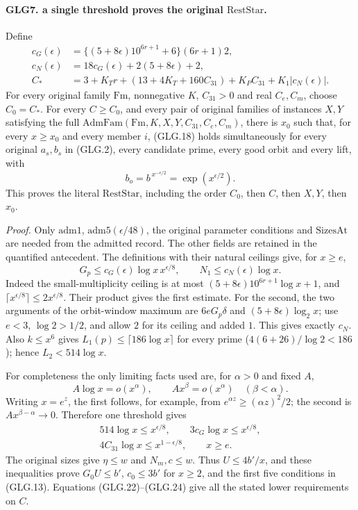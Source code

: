 \paragraph{GLG7. a single threshold proves the original \(\mathrm{RestStar}\).}
\label{claim:GLG7}
Define
\[
 \begin{split}
 c_G(\epsilon)&=\{(5+8\epsilon)10^{6r+1}+6\}(6r+1)2,\\
 c_N(\epsilon)&=18c_G(\epsilon)+2(5+8\epsilon)+2,\\
 C_*&=3+K_Tr+(13+4K_T+160C_{31})
                    +K_PC_{31}+K_1|c_N(\epsilon)|.
 \end{split}                                                       \tag{GLG.22}
\]
For every original family \(\mathrm{Fm}\), nonnegative \(K\),
\(C_{31}>0\) and real \(C_e,C_m\), choose \(C_0=C_*\).
For every \(C\ge C_0\), and every pair of original families
of instances \(X,Y\) satisfying the full
\(\mathrm{AdmFam}(\mathrm{Fm},K,X,Y,C_{31},C_e,C_m)\),
there is \(x_0\) such that, for every \(x\ge x_0\) and every
member \(i\), (GLG.18) holds simultaneously for every
original \(a_s,b_s\) in (GLG.2), every candidate prime,
every good orbit and every lift, with
\[
          b_o=b^{\,x^{-\epsilon/2}}=\exp(x^{\epsilon/2}).           \tag{GLG.23}
\]
This proves the literal \(\mathrm{RestStar}\), including the
order \(C_0\), then \(C\), then \(X,Y\), then \(x_0\).

\emph{Proof.}
Only \(\mathrm{adm1}\), \(\mathrm{adm5}(\epsilon/48)\),
the original parameter conditions and \(\mathrm{SizesAt}\)
are needed from the admitted record. The other fields are
retained in the quantified antecedent.
The definitions with their natural ceilings give, for \(x\ge e\),
\[
 G_p\le c_G(\epsilon)\log x\,x^{\epsilon/8},
             \qquad N_1\le c_N(\epsilon)\log x.                  \tag{GLG.24}
\]
Indeed the small-multiplicity ceiling is at most
\((5+8\epsilon)10^{6r+1}\log x+1\), and
\(\lceil x^{\epsilon/8}\rceil\le2x^{\epsilon/8}\).
Their product gives the first estimate. For the second,
the two arguments of the orbit-window maximum are
\(6eG_p\delta\) and \((5+8\epsilon)\log_2x\);
use \(e<3\), \(\log2>1/2\), and allow \(2\) for its
ceiling and added \(1\). This gives exactly \(c_N\).
Also \(k\le x^6\) gives
\(L_1(p)\le\lceil186\log x\rceil\) for every prime
(\(4(6+26)/\log2<186\)); hence \(L_2<514\log x\).

For completeness the only limiting facts used are, for
\(\alpha>0\) and fixed \(A\),
\[
 A\log x=o(x^\alpha),\qquad
 Ax^\beta=o(x^\alpha)\quad(\beta<\alpha).
 \]
Writing \(x=e^z\), the first follows, for example, from
\(e^{\alpha z}\ge(\alpha z)^2/2\); the second is
\(Ax^{\beta-\alpha}\to0\). Therefore one threshold gives
\[
 \begin{gathered}
 514\log x\le x^{\epsilon/8},\qquad
 3c_G\log x\le x^{\epsilon/8},\\
 4C_{31}\log x\le x^{1-\epsilon/8},\qquad x\ge e .
 \end{gathered}
 \]
The original sizes give \(\eta\le w\) and \(N_m,c\le w\).
Thus \(U\le4b'/x\), and these inequalities prove
\(G_0U\le b'\), \(c_0\le3b'\) for \(x\ge2\), and the
first five conditions in (GLG.13). Equations (GLG.22)--(GLG.24)
give all the stated lower requirements on \(C\).


